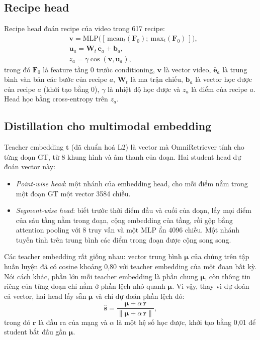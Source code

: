 \documentclass{IEEEtran}
\begin{document}
\subsection{Recipe head}
Recipe head đoán recipe của video trong 617 recipe:
\begin{equation}
\label{eq:art}
\begin{aligned}
&\mathbf{v} = \mathrm{MLP}\big([\,\mathrm{mean}_t(\mathbf{F}_0);\ \mathrm{max}_t(\mathbf{F}_0)\,]\big),\\
&\mathbf{u}_a = \mathbf{W}_t\, \bar{\mathbf{e}}_a + \mathbf{b}_a,\\
&z_a = \gamma \cos(\mathbf{v}, \mathbf{u}_a),
\end{aligned}
\end{equation}
trong đó $\mathbf{F}_0$ là feature tầng 0 trước conditioning, $\mathbf{v}$ là vector video, $\bar{\mathbf{e}}_a$ là trung bình văn bản các bước của recipe $a$, $\mathbf{W}_t$ là ma trận chiếu, $\mathbf{b}_a$ là vector học được của recipe $a$ (khởi tạo bằng 0), $\gamma$ là nhiệt độ học được và $z_a$ là điểm của recipe $a$. Head học bằng cross-entropy trên $z_a$.

\subsection{Distillation cho multimodal embedding}
Teacher embedding $\mathbf{t}$ (đã chuẩn hoá L2) là vector mà OmniRetriever tính cho từng đoạn GT, từ 8 khung hình và âm thanh của đoạn. Hai student head dự đoán vector này:
\begin{itemize}
\item \emph{Point-wise head}: một nhánh của embedding head, cho mỗi điểm nằm trong một đoạn GT một vector 3584 chiều.
\item \emph{Segment-wise head}: biết trước thời điểm đầu và cuối của đoạn, lấy mọi điểm của sáu tầng nằm trong đoạn, cộng embedding của tầng, rồi gộp bằng attention pooling với 8 truy vấn và một MLP ẩn 4096 chiều. Một nhánh tuyến tính trên trung bình các điểm trong đoạn được cộng song song.
\end{itemize}
Các teacher embedding rất giống nhau: vector trung bình $\boldsymbol{\mu}$ của chúng trên tập huấn luyện đã có cosine khoảng 0,80 với teacher embedding của một đoạn bất kỳ. Nói cách khác, phần lớn mỗi teacher embedding là phần chung $\boldsymbol{\mu}$, còn thông tin riêng của từng đoạn chỉ nằm ở phần lệch nhỏ quanh $\boldsymbol{\mu}$. Vì vậy, thay vì dự đoán cả vector, hai head lấy sẵn $\boldsymbol{\mu}$ và chỉ dự đoán phần lệch đó:
\begin{equation}
\label{eq:dev}
\hat{\mathbf{s}} = \frac{\boldsymbol{\mu} + \alpha\,\mathbf{r}}{\lVert \boldsymbol{\mu} + \alpha\,\mathbf{r} \rVert},
\end{equation}
trong đó $\mathbf{r}$ là đầu ra của mạng và $\alpha$ là một hệ số học được, khởi tạo bằng 0,01 để student bắt đầu gần $\boldsymbol{\mu}$.
\end{document}
